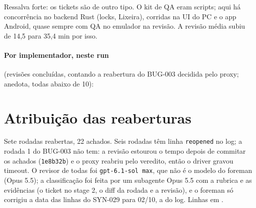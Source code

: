 \documentclass[11pt,a4paper]{article}
\begin{document}
\medskip
Ressalva forte: os tickets são de outro tipo. O kit de QA eram scripts; aqui
há concorrência no backend Rust (locks, Lixeira), corridas na UI do PC e o app
Android, quase sempre com QA no emulador na revisão. A revisão média subiu de
14,5 para 35,4 min por isso.

\paragraph{Por implementador, neste run} (revisões concluídas, contando a
reabertura do BUG-003 decidida pelo proxy; anedota, todas abaixo de 10):

\medskip
{}

\section{Atribuição das reaberturas}

Sete rodadas reabertas, 22 achados. Seis rodadas têm linha \texttt{reopened}
no log; a rodada 1 do BUG-003 não tem: a revisão estourou o tempo depois de
commitar os achados (\texttt{1e8b32b}) e o proxy reabriu pelo veredito, então o
driver gravou timeout. O revisor de todas foi \texttt{gpt-6.1-sol max}, que não é
o modelo do foreman (Opus 5.5); a classificação foi feita por um subagente
Opus 5.5 com a rubrica e as evidências (o ticket no stage 2, o diff da rodada e
a revisão), e o foreman só corrigiu a data das linhas do SYN-029 para 02/10, a
do log. Linhas em .
\end{document}
